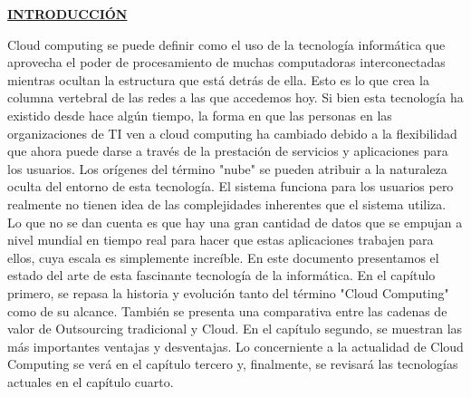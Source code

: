 \documentclass[a4paper, 12pt]{report}
\begin{document}
\vspace*{6em}
\begin{center}
{\bf{\large{\underline{INTRODUCCI\'ON}}}}
\end{center}
\begin{justify}
Cloud computing se puede definir como el uso de la tecnología informática que aprovecha el poder de procesamiento de muchas computadoras interconectadas mientras ocultan la estructura que está detrás de ella.
Esto es lo que crea la columna vertebral de las redes a las que accedemos hoy. Si bien esta tecnología ha existido desde hace algún tiempo, la forma en que las personas en las organizaciones de TI ven a cloud computing ha cambiado debido a la flexibilidad que ahora puede darse a través de la prestación de servicios y aplicaciones para los usuarios.
Los orígenes del término "nube" se pueden atribuir a la naturaleza oculta del entorno de esta tecnología. El sistema funciona para los usuarios pero realmente no tienen idea de las complejidades inherentes que el sistema utiliza. Lo que no se dan cuenta es que hay una gran cantidad de datos que se empujan a nivel mundial en tiempo real para hacer que estas aplicaciones trabajen para ellos, cuya escala es simplemente increíble.
En este documento presentamos el estado del arte de esta fascinante tecnología de la informática. En el capítulo primero, se repasa la historia y evolución tanto del término "Cloud Computing" como de su alcance. También se presenta una comparativa entre las cadenas de valor de Outsourcing tradicional y Cloud. En el capítulo segundo, se muestran las más importantes ventajas y desventajas. Lo concerniente a la actualidad de Cloud Computing se verá en el capítulo tercero y, finalmente, se revisará las tecnologías actuales en el capítulo cuarto.
\end{justify}
\newpage


\singlespacing
\renewcommand{\contentsname}{\centering\bf{\large{{\'INDICE GENERAL}}}}
\renewcommand{\listfigurename}{\centering\bf{\large{{LISTA DE FIGURAS}}}}
\renewcommand{\listtablename}{\centering\bf{\large{{LISTA DE TABLAS}}}}

\tableofcontents    %
\listoffigures      %
\listoftables       %
\end{document}
